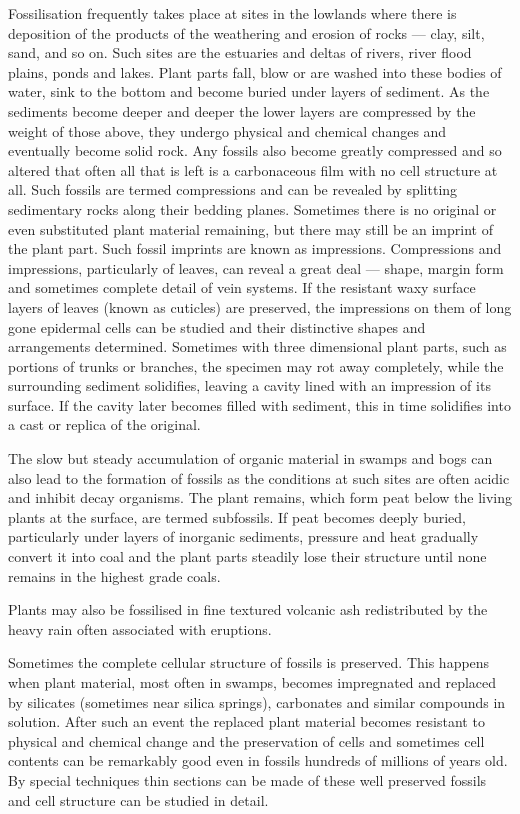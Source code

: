 Fossilisation frequently takes place at sites in the lowlands where there is deposition of the products of the weathering and erosion of rocks --- clay, silt, sand, and so on.
Such sites are the estuaries and deltas of rivers, river flood plains, ponds and lakes.
Plant parts fall, blow or are washed into these bodies of water, sink to the bottom and become buried under layers of sediment.
As the sediments become deeper and deeper the lower layers are compressed by the weight of those above, they undergo physical and chemical changes and eventually become solid rock.
Any fossils also become greatly compressed and so altered that often all that is left is a carbonaceous film with no cell structure at all.
Such fossils are termed compressions and can be revealed by splitting sedimentary rocks along their bedding planes.
Sometimes there is no original or even substituted plant material remaining, but there may still be an imprint of the plant part.
Such fossil imprints are known as impressions.
Compressions and impressions, particularly of leaves, can reveal a great deal --- shape, margin form and sometimes complete detail of vein systems.
If the resistant waxy surface layers of leaves (known as cuticles) are preserved, the impressions on them of long gone epidermal cells can be studied and their distinctive shapes and arrangements determined.
Sometimes with three dimensional plant parts, such as portions of trunks or branches, the specimen may rot away completely, while the surrounding sediment solidifies, leaving a cavity lined with an impression of its surface.
If the cavity later becomes filled with sediment, this in time solidifies into a cast or replica of the original.

The slow but steady accumulation of organic material in swamps and bogs can also lead to the formation of fossils as the conditions at such sites are often acidic and inhibit decay organisms.
The plant remains, which form peat below the living plants at the surface, are termed subfossils.
If peat becomes deeply buried, particularly under layers of inorganic sediments, pressure and heat gradually convert it into coal and the plant parts steadily lose their structure until none remains in the highest grade coals.

Plants may also be fossilised in fine textured volcanic ash redistributed by the heavy rain often associated with eruptions.

Sometimes the complete cellular structure of fossils is preserved.
This happens when plant material, most often in swamps, becomes impregnated and replaced by silicates (sometimes near silica springs), carbonates and similar compounds in solution.
After such an event the replaced plant material becomes resistant to physical and chemical change and the preservation of cells and sometimes cell contents can be remarkably good even in fossils hundreds of millions of years old.
By special techniques thin sections can be made of these well preserved fossils and cell structure can be studied in detail.

